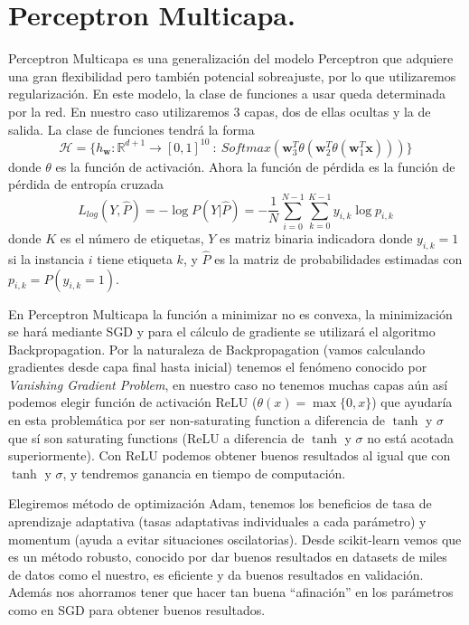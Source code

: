 \documentclass[11pt,a4paper]{article}
\theoremstyle{definition}
\newcommand{\R}{\mathbb{R}}
\begin{document}
	\section{Perceptron Multicapa.}
	Perceptron Multicapa es una generalización del modelo Perceptron que adquiere una gran flexibilidad pero también potencial sobreajuste, por lo que utilizaremos regularización. En este modelo, la clase de funciones a usar queda determinada por la red. En nuestro caso utilizaremos 3 capas, dos de ellas ocultas y la de salida. La clase de funciones tendrá la forma
	$$\mathcal{H}=\{h_{\mathbf{w}} \colon \R^{d+1} \to [0,1]^{10} \ : \ Softmax \left(\mathbf{w}_3^T \theta (\mathbf{w}_2^T \theta (\mathbf{w}_1^T \mathbf{x}))\right)\}$$
	donde $\theta$ es la función de activación. Ahora la función de pérdida es la función de pérdida de entropía cruzada 
	$$L_{log}(Y,\hat P)=-\log P(Y|\hat P)=-\frac{1}{N} \sum_{i=0}^{N-1}\sum_{k=0}^{K-1} y_{i,k} \log p_{i,k}$$
	donde $K$ es el número de etiquetas, $Y$ es matriz binaria indicadora donde $y_{i,k}=1$ si la instancia $i$ tiene etiqueta $k$, y $\hat P$ es la matriz de probabilidades estimadas con $p_{i,k}=P(y_{i,k}=1)$.
	
	 En Perceptron Multicapa la función  a minimizar no es convexa, la minimización se hará mediante SGD y para el cálculo de gradiente se utilizará el algoritmo Backpropagation. Por la naturaleza de Backpropagation (vamos calculando gradientes desde capa final hasta inicial) tenemos el fenómeno conocido por \textit{Vanishing Gradient Problem}, en nuestro caso no tenemos muchas capas aún así podemos elegir función de activación ReLU ($\theta (x)=\max\{0,x\}$) que ayudaría en esta problemática por ser non-saturating function a diferencia de $\tanh$ y $\sigma$ que sí son  saturating functions (ReLU a diferencia de $\tanh$ y $\sigma$ no está acotada superiormente). Con ReLU podemos obtener buenos resultados al igual que con $\tanh$ y $\sigma$, y tendremos ganancia en tiempo de computación. 
	
	Elegiremos método de optimización Adam, tenemos los beneficios de tasa de aprendizaje adaptativa (tasas adaptativas individuales a cada parámetro) y momentum (ayuda a evitar situaciones oscilatorias). Desde scikit-learn vemos que es un método robusto, conocido por dar buenos resultados en datasets de miles de datos como el nuestro, es eficiente y da buenos resultados en validación. Además nos ahorramos tener que hacer tan buena ``afinación'' en los parámetros como en SGD para obtener buenos resultados.
\end{document}
